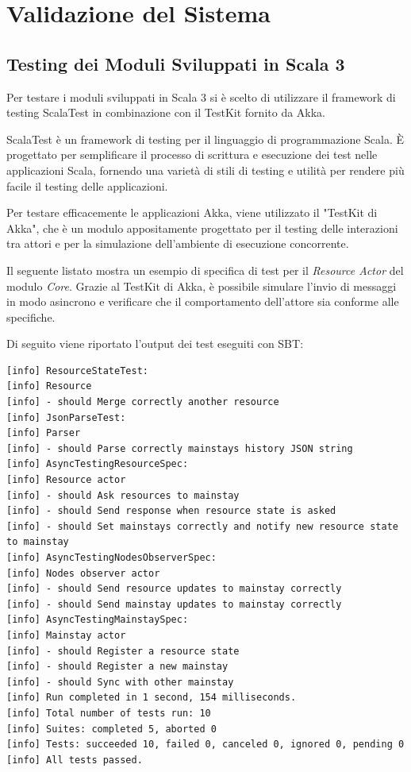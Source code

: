\documentclass{scrartcl}
\begin{document}
\section{Validazione del Sistema}

\subsection{Testing dei Moduli Sviluppati in Scala 3}

Per testare i moduli sviluppati in Scala 3 si è scelto di utilizzare il framework di testing ScalaTest\cite{scalatest} in combinazione con il TestKit fornito da Akka.

ScalaTest è un framework di testing per il linguaggio di programmazione Scala. È progettato per semplificare il processo di scrittura e esecuzione dei test nelle applicazioni Scala, fornendo una varietà di stili di testing e utilità per rendere più facile il testing delle applicazioni.

Per testare efficacemente le applicazioni Akka, viene utilizzato il "TestKit di Akka", che è un modulo appositamente progettato per il testing delle interazioni tra attori e per la simulazione dell'ambiente di esecuzione concorrente.

Il seguente listato mostra un esempio di specifica di test per il \textit{Resource Actor} del modulo \textit{Core}. Grazie al TestKit di Akka, è possibile simulare l'invio di messaggi in modo asincrono e verificare che il comportamento dell'attore sia conforme alle specifiche.



Di seguito viene riportato l'output dei test eseguiti con SBT:

\begin{lstlisting}
[info] ResourceStateTest:
[info] Resource
[info] - should Merge correctly another resource
[info] JsonParseTest:
[info] Parser
[info] - should Parse correctly mainstays history JSON string
[info] AsyncTestingResourceSpec:
[info] Resource actor
[info] - should Ask resources to mainstay
[info] - should Send response when resource state is asked
[info] - should Set mainstays correctly and notify new resource state to mainstay
[info] AsyncTestingNodesObserverSpec:
[info] Nodes observer actor
[info] - should Send resource updates to mainstay correctly
[info] - should Send mainstay updates to mainstay correctly
[info] AsyncTestingMainstaySpec:
[info] Mainstay actor
[info] - should Register a resource state
[info] - should Register a new mainstay
[info] - should Sync with other mainstay
[info] Run completed in 1 second, 154 milliseconds.
[info] Total number of tests run: 10
[info] Suites: completed 5, aborted 0
[info] Tests: succeeded 10, failed 0, canceled 0, ignored 0, pending 0
[info] All tests passed.

\end{lstlisting}
\end{document}
